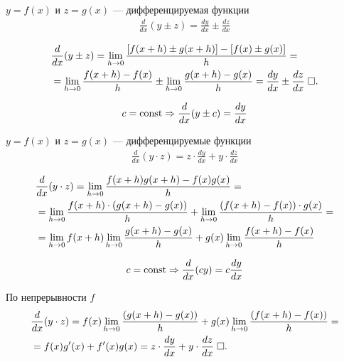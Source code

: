 \documentclass{article}
\begin{document}

\theorem

$y=f(x)$ и $z=g(x)$ --- дифференцируемая функции
\begin{align*}
	\frac{d}{dx} (y \pm z) = \frac{dy}{dx} \pm \frac{dz}{dx}
\end{align*}

\proof
\begin{align*}
	 & \frac{d}{dx}(y\pm z)=\lim_{h \to 0} \frac{[f(x+h) \pm g(x+h)] - [f(x) \pm g(x)]}{h}=                                    \\
	 & = \lim_{h \to 0} \frac{f(x+h) - f(x)}{h} \pm \lim_{h \to 0} \frac{g(x+h) - g(x)}{h} = \frac{dy}{dx}\pm\frac{dz}{dx}\qed
\end{align*}

\result
\begin{align*}
	c=\const\Rarr\frac{d}{dx}(y\pm c)=\frac{dy}{dx}
\end{align*}

\theorem

$y=f(x)$ и $z=g(x)$ --- дифференцируемые функции
\begin{align*}
	\frac{d}{dx} (y \cdot z) = z \cdot \frac{dy}{dx} + y \cdot \frac{dz}{dx}
\end{align*}

\proof
\begin{align*}
	 & \frac{d}{dx} (y \cdot z) = \lim_{h \to 0} \frac{f(x+h)g(x+h) - f(x)g(x)}{h} =                                  \\
	 & =\lim_{h \to 0} \frac{f(x+h) \cdot (g(x+h) - g(x))}{h} + \lim_{h \to 0} \frac{(f(x+h) - f(x)) \cdot g(x)}{h} = \\
	 & =\slim{h\to 0}f(x+h)\lim_{h \to 0} \frac{g(x+h) - g(x)}{h} + g(x)\lim_{h \to 0} \frac{f(x+h) - f(x)}{h}
\end{align*}

\result
\begin{align*}
	c=\const\Rarr\frac{d}{dx}(cy)=c\frac{dy}{dx}
\end{align*}

По непрерывности $f$
\begin{align*}
	 & \frac{d}{dx} (y \cdot z) =f(x)\lim_{h \to 0} \frac{(g(x+h) - g(x))}{h} + g(x)\lim_{h \to 0} \frac{(f(x+h) - f(x))}{h}= \\
	 & =f(x)g'(x)+f'(x)g(x)=z \cdot \frac{dy}{dx} + y \cdot \frac{dz}{dx}\qed
\end{align*}
\end{document}
